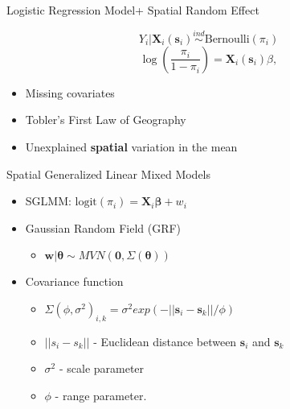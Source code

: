 \documentclass{beamer}
\def\bdm{\begin{displaymath}}
\def\edm{\end{displaymath}}
\begin{document}
\begin{frame}{Logistic Regression Model}{+ Spatial Random Effect} %

\bdm
Y_{i}|\mathbf{X}_{i}(\mathbf{s}_{i}) \stackrel{ind}{\sim} \mbox{Bernoulli}(\pi_{i})
\edm
\bdm
\log\left(\frac{\pi_{i}}{1-\pi_{i}}\right) = \mathbf{X}_{i}(\mathbf{s}_{i})\beta,
\edm
\begin{itemize}
\addtolength{\itemsep}{0.5\baselineskip}
\item Missing covariates
\item Tobler's First Law of Geography
\item Unexplained {\bf spatial} variation in the mean
\end{itemize}
\end{frame}

\begin{frame}{Spatial Generalized Linear Mixed Models}{} %
\begin{itemize}
\addtolength{\itemsep}{0.5\baselineskip}

\item SGLMM: $\text{logit}(\pi_{i}) = \pmb{X}_{i} \pmb{\beta} + w_{i}$
\item Gaussian Random Field (GRF)
  \begin{itemize}
  \item $\pmb{w} | \pmb{\theta} \sim MVN(\pmb{0}, \Sigma(\pmb{\theta}))$
  \end{itemize}

\item Covariance function
  \begin{itemize}
  \addtolength{\itemsep}{0.5\baselineskip}
  \item $ \Sigma(\phi, \sigma^{2})_{i,k} = \sigma^{2} exp(-||\pmb{s}_{i} - \pmb{s}_{k}||/\phi) $

  \item $||s_{i} - s_{k}||$ - Euclidean distance between $\pmb{s}_{i}$ and $\pmb{s}_{k}$
  \item $\sigma^{2}$ - scale parameter
  \item $\phi$ - range parameter.
  \end{itemize}
\end{itemize}
\end{frame}
\end{document}
